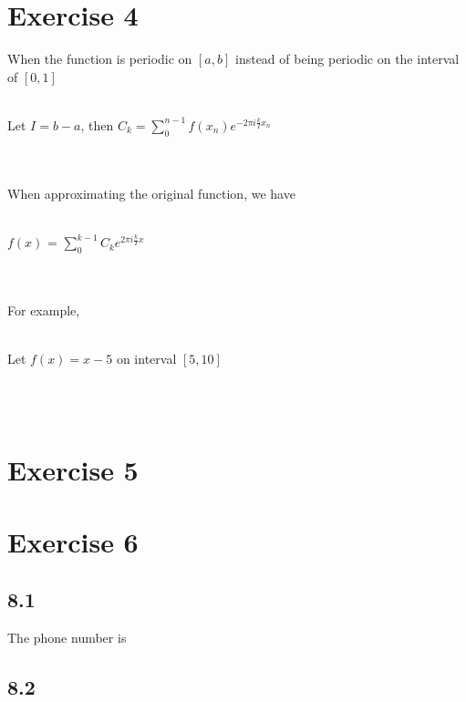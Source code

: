 \documentclass[11pt]{article} %
\begin{document}
\section{Exercise 4}
When the function is periodic on $[a,b]$ instead of being periodic on the interval of $[0,1]$\\\\
\centerline{Let $I = b-a$, then $C_{k} = \sum_{0}^{n-1}f(x_{n})e^{-2\pi i \frac{k}{I}x_{n}}$}\\\\
When approximating the original function, we have \\\\
\centerline{$f(x)$ = $\sum_{0}^{k-1}C_{k}e^{2\pi i \frac{k}{I}x}$}\\\\
For example,\\\\
\centerline{Let $f(x) = x-5$ on interval $[5,10]$}\\\\

\section{Exercise 5}
\section{Exercise 6}
\subsection{8.1}
The phone number is 
\subsection{8.2}
\end{document}
